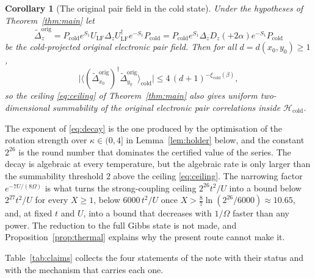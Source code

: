 \documentclass[11pt]{article}
\theoremstyle{plain}
\newtheorem{corollary}{Corollary}[theorem]
\theoremstyle{definition}
\newcommand{\Dop}{\Delta}
\begin{document}
\begin{corollary}[The original pair field in the cold state]\label{cor:orig}
Under the hypotheses of Theorem~\ref{thm:main} let
\begin{equation}\label{eq:origpair}
\tilde\Dop^{\mathrm{orig}}_z
=P_{\mathrm{cold}}e^{S_1}U_{\mathrm{LF}}\Dop_zU_{\mathrm{LF}}^\dagger e^{-S_1}P_{\mathrm{cold}}
=P_{\mathrm{cold}}e^{S_1}\Dop_zD_z(+2\alpha)e^{-S_1}P_{\mathrm{cold}}
\end{equation}
be the cold-projected original electronic pair field. Then for all
$d=d(x_0,y_0)\ge1$,
\begin{equation}\label{eq:corbound}
\bigl|\bigl\langle(\tilde\Dop^{\mathrm{orig}}_{x_0})^\dagger\tilde\Dop^{\mathrm{orig}}_{y_0}\bigr\rangle_{\mathrm{cold}}\bigr|
\le4\,(d+1)^{-\xi_{\mathrm{cold}}(\beta)},
\end{equation}
so the ceiling \eqref{eq:ceiling} of Theorem~\ref{thm:main} also gives uniform
two-dimensional summability of the original electronic pair correlations inside
$\mathcal{H}_{\mathrm{cold}}$.
\end{corollary}

The exponent of \eqref{eq:decay} is the one produced by the optimisation of the
rotation strength over $\kappa\in(0,4]$ in Lemma~\ref{lem:holder} below, and the
constant $2^{26}$ is the round number that dominates the certified value of the
series. The decay is algebraic at every temperature, but the algebraic rate is
only larger than the summability threshold $2$ above the ceiling
\eqref{eq:ceiling}. The narrowing factor $e^{-7U/(8\Omega)}$ is what turns the
strong-coupling ceiling $2^{26}t^{2}/U$ into a bound below $2^{27}t^{2}/U$ for
every $X\ge1$, below $6000\,t^{2}/U$ once
$X>\frac{8}{7}\ln(2^{26}/6000)\approx10.65$, and, at fixed $t$ and $U$, into a
bound that decreases with $1/\Omega$ faster than any power. The reduction to the full Gibbs state is not made, and
Proposition~\ref{prop:thermal} explains why the present route cannot make it.

Table~\ref{tab:claims} collects the four statements of the note with their status
and with the mechanism that carries each one.
\end{document}
